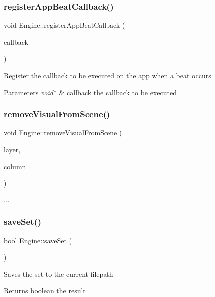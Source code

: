 \subsubsection{\texorpdfstring{register\+App\+Beat\+Callback()}{registerAppBeatCallback()}}
{\footnotesize\ttfamily void Engine\+::register\+App\+Beat\+Callback (\begin{DoxyParamCaption}\item[{void($\ast$)(void)}]{callback }\end{DoxyParamCaption})}

Register the callback to be executed on the app when a beat occurs 
\begin{DoxyParams}{Parameters}
{\em void$\ast$} & callback the callback to be executed \\
\hline
\end{DoxyParams}
\mbox{\label{class_engine_af8b450a6e2bb5979b4216a143e010045}} 
\subsubsection{\texorpdfstring{remove\+Visual\+From\+Scene()}{removeVisualFromScene()}}
{\footnotesize\ttfamily void Engine\+::remove\+Visual\+From\+Scene (\begin{DoxyParamCaption}\item[{unsigned int}]{layer,  }\item[{unsigned int}]{column }\end{DoxyParamCaption})}

... \mbox{\label{class_engine_abdf0e7642de80e72a9a64c559d2af9ba}} 
\subsubsection{\texorpdfstring{save\+Set()}{saveSet()}}
{\footnotesize\ttfamily bool Engine\+::save\+Set (\begin{DoxyParamCaption}{ }\end{DoxyParamCaption})}

Saves the set to the current filepath \begin{DoxyReturn}{Returns}
boolean the result 
\end{DoxyReturn}
\mbox{\label{class_engine_a699dad06243f1f462f9e2f6f6e33cbdb}} 
